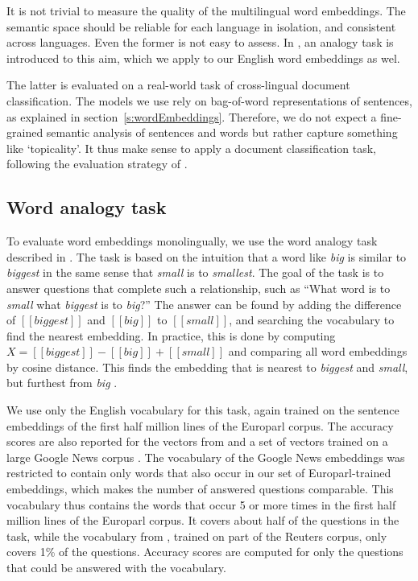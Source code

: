 

It is not trivial to measure the quality of the multilingual word embeddings. The semantic space should be reliable for each language in isolation, and consistent across languages. 
Even the former is not easy to assess. In \cite{mikolov2013efficient}, an analogy task is introduced to this aim, which we apply to our English word embeddings as wel.

The latter is evaluated on a real-world task of cross-lingual document classification. The models we use rely on bag-of-word representations of sentences, as explained in section~\ref{s:wordEmbeddings}. Therefore, we do not expect a fine-grained semantic analysis of sentences and words but rather capture something like `topicality'. It thus make sense to apply a document classification task, following the evaluation strategy of  \cite{klementiev2012inducing, hermann2013multilingual,hermann2014multilingual}.


\subsection{Word analogy task}
To evaluate word embeddings monolingually, we use the word analogy task described in \cite{mikolov2013efficient}.
The task is based on the intuition that a word like \emph{big} is similar to \emph{biggest} in the same sense that \emph{small} is to \emph{smallest}.
The goal of the task is to answer questions that complete such a relationship, such as ``What word is to \emph{small} what \emph{biggest} is to \emph{big}?''
The answer can be found by adding the difference of $[\![\mathit{biggest}]\!]$ and $[\![\mathit{big}]\!]$ to $[\![\mathit{small}]\!]$, and searching the vocabulary to find the nearest embedding.
In practice, this is done by computing $X = [\![\mathit{biggest}]\!] - [\![\mathit{big}]\!]+ [\![\mathit{small}]\!]$ and comparing all word embeddings by cosine distance.
This finds the embedding that is nearest to \emph{biggest} and \emph{small}, but furthest from \emph{big} \cite{Levy2014}.

We use only the English vocabulary for this task, again trained on the sentence embeddings of the first half million lines of the Europarl corpus.
The accuracy scores are also reported for the vectors from \cite{klementiev2012inducing} and a set of vectors trained on a large Google News corpus \cite{mikolov2013efficient}.
The vocabulary of the Google News embeddings was restricted to contain only words that also occur in our set of Europarl-trained embeddings, which makes the number of answered questions comparable.
This vocabulary thus contains the words that occur 5 or more times in the first half million lines of the Europarl corpus.
It covers about half of the questions in the task, while the vocabulary from \cite{klementiev2012inducing}, trained on part of the Reuters corpus, only covers 1\% of the questions. 
Accuracy scores are computed for only the questions that could be answered with the vocabulary.


